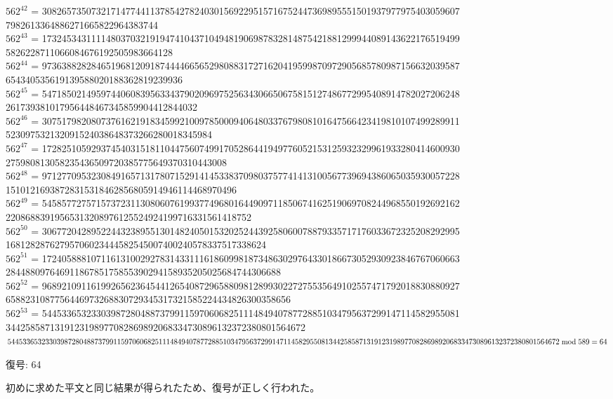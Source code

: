 \documentclass[uplatex]{jsarticle}
\begin{document}
$562^{42}$ = 3082657350732171477441137854278240301569229515716752447369895551501937977975403059607\\7982613364886271665822964383744\\
$562^{43}$ = 1732453431111480370321919474104371049481906987832814875421881299944089143622176519499\\5826228711066084676192505983664128\\
$562^{44}$ = 9736388282846519681209187444466565298088317271620419599870972905685780987156632039587\\654340535619139588020188362819239936\\
$562^{45}$ = 5471850214959744060839563343790209697525634306650675815127486772995408914782027206248\\261739381017956448467345859904412844032\\
$562^{46}$ = 3075179820807376162191834599210097850009406480337679808101647566423419810107499289911\\523097532132091524038648373266280018345984\\
$562^{47}$ = 1728251059293745403151811044756074991705286441949776052153125932329961933280414600930\\275980813058235436509720385775649370310443008\\
$562^{48}$ = 9712770953230849165713178071529141453383709803757741413100567739694386065035930057228\\15101216938728315318462856805914946114468970496\\
$562^{49}$ = 5458577275715737231130806076199377496801644909711850674162519069708244968550192692162\\22086883919565313208976125524924199716331561418752\\
$562^{50}$ = 3067720428952244323895513014824050153202524439258060078879335717176033672325208292995\\16812828762795706023444582545007400240578337517338624\\
$562^{51}$ = 1724058881071161310029278314331116186099818734863029764330186673052930923846767060663\\28448809764691186785175855390294158935205025684744306688\\
$562^{52}$ = 9689210911619926562364544126540872965880981289930227275535649102557471792018830880927\\6588231087756446973268830729345317321585224434826300358656\\
$562^{53}$ = 5445336532330398728048873799115970606825111484940787728851034795637299147114582955081\\3442585871319123198977082869892068334730896132372380801564672\\
$54453365323303987280488737991159706068251114849407877288510347956372991471145829550813442585871319\\123198977082869892068334730896132372380801564672 \bmod 589 = 64$

復号: 64

初めに求めた平文と同じ結果が得られたため、復号が正しく行われた。


\end{document}
